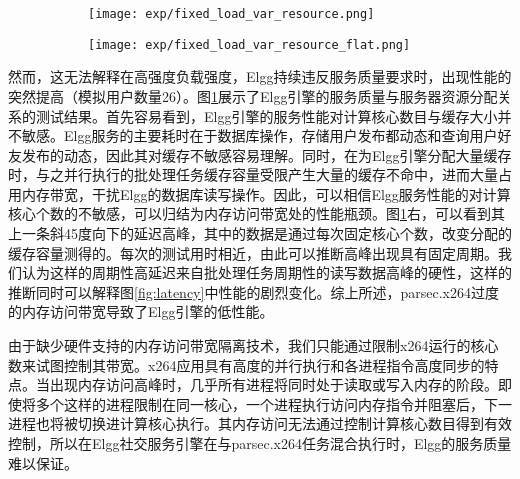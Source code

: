 \begin{figure}
  \centering
  \begin{subfigure}{0.4\textwidth}
    \centering
    \texttt{[image: exp/fixed\_load\_var\_resource.png]}

  \end{subfigure}
  \hspace{3em}
  \begin{subfigure}{0.5\textwidth}
    \centering
    \texttt{[image: exp/fixed\_load\_var\_resource\_flat.png]}

  \end{subfigure}
  \label{fig:fixed_load_var_resource}
\end{figure}

然而，这无法解释在高强度负载强度，Elgg持续违反服务质量要求时，出现性能的突然提高（模拟用户数量26）。图\ref{fig:fixed_load_var_resource}展示了Elgg引擎的服务质量与服务器资源分配关系的测试结果。首先容易看到，Elgg引擎的服务性能对计算核心数目与缓存大小并不敏感。Elgg服务的主要耗时在于数据库操作，存储用户发布都动态和查询用户好友发布的动态，因此其对缓存不敏感容易理解。同时，在为Elgg引擎分配大量缓存时，与之并行执行的批处理任务缓存容量受限产生大量的缓存不命中，进而大量占用内存带宽，干扰Elgg的数据库读写操作。因此，可以相信Elgg服务性能的对计算核心个数的不敏感，可以归结为内存访问带宽处的性能瓶颈。图\ref{fig:fixed_load_var_resource}右，可以看到其上一条斜45度向下的延迟高峰，其中的数据是通过每次固定核心个数，改变分配的缓存容量测得的。每次的测试用时相近，由此可以推断高峰出现具有固定周期。我们认为这样的周期性高延迟来自批处理任务周期性的读写数据高峰的硬性，这样的推断同时可以解释图\ref{fig:latency}中性能的剧烈变化。综上所述，parsec.x264过度的内存访问带宽导致了Elgg引擎的低性能。

由于缺少硬件支持的内存访问带宽隔离技术，我们只能通过限制x264运行的核心数来试图控制其带宽。x264应用具有高度的并行执行和各进程指令高度同步的特点。当出现内存访问高峰时，几乎所有进程将同时处于读取或写入内存的阶段。即使将多个这样的进程限制在同一核心，一个进程执行访问内存指令并阻塞后，下一进程也将被切换进计算核心执行。其内存访问无法通过控制计算核心数目得到有效控制，所以在Elgg社交服务引擎在与parsec.x264任务混合执行时，Elgg的服务质量难以保证。

